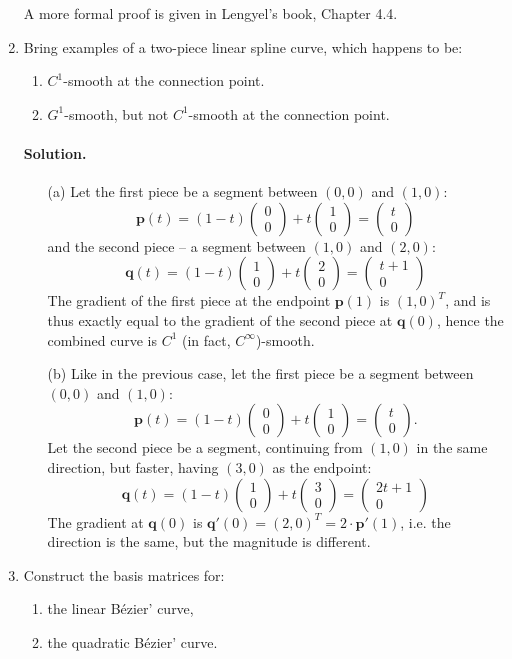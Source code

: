 \documentclass{article}
\newcommand{\bq}{\mathbf{q}}
\newcommand{\bp}{\mathbf{p}}
\newcommand{\Bezier}{B\'{e}zier}
\newcommand{\vectwo}[2]{\left(\begin{matrix} #1 \\ #2 \end{matrix}\right)}
\begin{document}
\begin{enumerate}
A more formal proof is given in Lengyel's book, Chapter 4.4.

\newpage

\item Bring examples of a two-piece linear spline curve, which happens to be:
\begin{enumerate}
\item $C^1$-smooth at the connection point.
\item $G^1$-smooth, but not $C^1$-smooth at the connection point.
\end{enumerate}

\paragraph{Solution.}
\begin{enumerate}
\item[(a)] Let the first piece be a segment between $(0, 0)$ and $(1, 0)$:
$$
\bp(t) = (1-t)\vectwo{0}{0} + t\vectwo{1}{0} = \vectwo{t}{0}
$$
and the second piece -- a segment between $(1, 0)$ and $(2, 0)$:
$$
\bq(t) = (1-t)\vectwo{1}{0} + t\vectwo{2}{0} = \vectwo{t+1}{0}
$$
The gradient of the first piece at the endpoint $\bp(1)$ is $(1,0)^T$, and is thus exactly equal to the gradient of the second piece at $\bq(0)$, hence the combined curve is $C^1$ (in fact, $C^\infty$)-smooth.

\item[(b)] Like in the previous case, let the first piece be a segment between $(0, 0)$ and $(1, 0)$:
$$
\bp(t) = (1-t)\vectwo{0}{0} + t\vectwo{1}{0} = \vectwo{t}{0}.
$$
Let the second piece be a segment, continuing from $(1,0)$ in the same direction, but faster, having $(3, 0)$ as the endpoint:
$$
\bq(t) = (1-t)\vectwo{1}{0} + t\vectwo{3}{0} = \vectwo{2t+1}{0}
$$
The gradient at $\bq(0)$ is $\bq'(0) = (2,0)^T = 2\cdot\bp'(1)$, i.e. the direction is the same, but the magnitude is different.
\end{enumerate}

\item Construct the basis matrices for:
\begin{enumerate}
\item the linear \Bezier' curve,
\item the quadratic \Bezier' curve.
\end{enumerate}


\end{enumerate}
\end{document}
